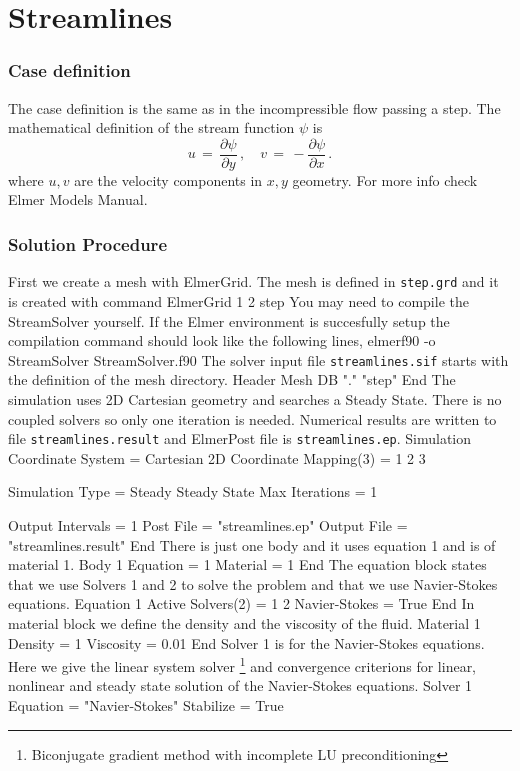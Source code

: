 \chapter{Streamlines}


\subsection*{Case definition}
The case definition is the same as in the incompressible flow passing a step.
The mathematical definition of the stream function $\psi$ is
\begin{equation}
u \, = \, \frac{\partial \psi}{\partial y} \, , \quad
v \, = \, - \frac{\partial \psi}{\partial x} \,.
\end{equation}
where $u,v$ are the velocity components in $x,y$ geometry.
For more info check Elmer Models Manual.

\subsection*{Solution Procedure}
First we create a mesh with ElmerGrid. The mesh is defined in
{\tt step.grd} and it is created with command
\ttbegin
ElmerGrid 1 2 step
\ttend
You may need to compile the StreamSolver yourself. If the Elmer environment is 
succesfully setup the compilation command should look like
the following lines, 
\ttbegin
elmerf90 -o StreamSolver StreamSolver.f90
\ttend
The solver input file {\tt streamlines.sif} starts with 
the definition of the mesh directory. 
\ttbegin
Header
  Mesh DB "." "step"
End
\ttend
The simulation uses 2D Cartesian geometry and searches a Steady State.
There is no coupled solvers so only one iteration is needed. 
Numerical results are written to file {\tt streamlines.result}
and ElmerPost file is {\tt streamlines.ep}.
\ttbegin
Simulation
  Coordinate System =  Cartesian 2D
  Coordinate Mapping(3) = 1 2 3

  Simulation Type = Steady
  Steady State Max Iterations = 1

  Output Intervals = 1
  Post File = "streamlines.ep"
  Output File = "streamlines.result"
End
\ttend
There is just one body and it uses equation 1 and
is of material 1.
\ttbegin
Body 1
  Equation = 1
  Material = 1
End
\ttend
The equation block states that we use Solvers 1 and 2 to solve the problem
and that we use Navier-Stokes equations.
\ttbegin
Equation 1
  Active Solvers(2) = 1 2
  Navier-Stokes = True
End
\ttend
In material block we define the density and the viscosity of the fluid.
\ttbegin
Material 1
  Density = 1
  Viscosity = 0.01
End
\ttend
Solver 1 is for the Navier-Stokes equations.
Here we give the linear system solver
\footnote{Biconjugate gradient method with incomplete LU preconditioning}
and convergence criterions for linear, nonlinear and steady state 
solution of the Navier-Stokes equations.
\ttbegin
Solver 1
  Equation = "Navier-Stokes"
  Stabilize = True

